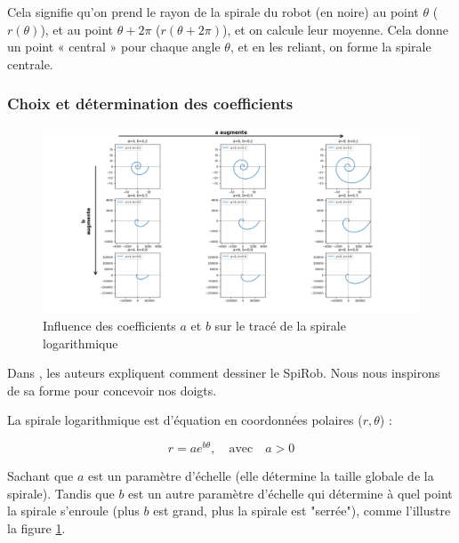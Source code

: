 \documentclass[a4paper, 11pt]{report}
\begin{document}
            Cela signifie qu’on prend le rayon de la spirale du robot (en noire) au point $\theta$ ($r(\theta)$), et au point $\theta + 2\pi$ ($r(\theta + 2\pi)$), et on calcule leur moyenne. Cela donne un point « central » pour chaque angle $\theta$, et en les reliant, on forme la spirale centrale. \cite{wang_spirobs_2025}

        \subsubsection{Choix et détermination des coefficients}

            \begin{figure}
                \centering
                \includegraphics[width=1\textwidth]{Figures/spirale.png}
                \caption{Influence des coefficients $a$ et $b$ sur le tracé de la spirale logarithmique}
                \label{fig:spirale}
            \end{figure}
        
            Dans \cite{wang_spirobs_2025}, les auteurs expliquent comment dessiner le SpiRob. Nous nous inspirons de sa forme pour concevoir nos doigts.
        
            La spirale logarithmique est d'équation en coordonnées polaires ($r, \theta$) :

            \begin{equation}
                r = ae^{b\theta}, \quad \text{avec} \quad a > 0
                \label{eq:spirale_log}
            \end{equation}
            
            Sachant que $a$ est un paramètre d’échelle (elle détermine la taille globale de la spirale). Tandis que $b$ est un autre paramètre d’échelle qui détermine à quel point la spirale s’enroule (plus $b$ est grand, plus la spirale est "serrée"), comme l'illustre la figure \ref{fig:spirale}.
            
\end{document}
